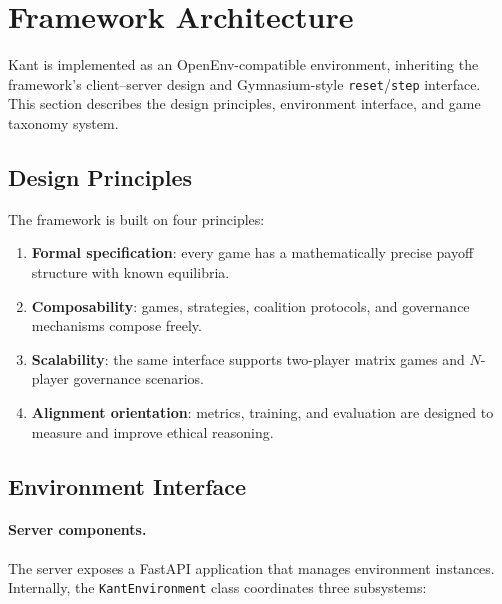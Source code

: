 
\section{Framework Architecture}
\label{sec:architecture}

Kant is implemented as an OpenEnv-compatible environment, inheriting the
framework's client--server design and Gymnasium-style
\texttt{reset}/\texttt{step} interface. This section describes the design
principles, environment interface, and game taxonomy system.

\subsection{Design Principles}
\label{sec:design-principles}

The framework is built on four principles:

\begin{enumerate}[nosep]
    \item \textbf{Formal specification}: every game has a mathematically
          precise payoff structure with known equilibria.
    \item \textbf{Composability}: games, strategies, coalition protocols,
          and governance mechanisms compose freely.
    \item \textbf{Scalability}: the same interface supports two-player
          matrix games and $N$-player governance scenarios.
    \item \textbf{Alignment orientation}: metrics, training, and evaluation
          are designed to measure and improve ethical reasoning.
\end{enumerate}

\subsection{Environment Interface}
\label{sec:env-interface}

\paragraph{Server components.}
The server exposes a FastAPI application that manages environment
instances. Internally, the \texttt{KantEnvironment} class
coordinates three subsystems:

